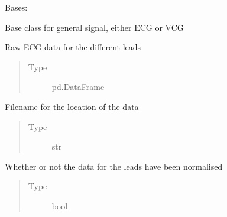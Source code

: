 \documentclass[letterpaper,10pt,english]{sphinxmanual}
\begin{document}
\begin{fulllineitems}
\label{\detokenize{_autosummary/signalanalysis.general.Signal:signalanalysis.general.Signal}}
\sphinxAtStartPar
Bases: 

\sphinxAtStartPar
Base class for general signal, either ECG or VCG

\begin{fulllineitems}
\label{\detokenize{_autosummary/signalanalysis.general.Signal:signalanalysis.general.Signal.data}}
\sphinxAtStartPar
Raw ECG data for the different leads
\begin{quote}\begin{description}
\item[{Type}] \leavevmode
\sphinxAtStartPar
pd.DataFrame

\end{description}\end{quote}

\end{fulllineitems}


\begin{fulllineitems}
\label{\detokenize{_autosummary/signalanalysis.general.Signal:signalanalysis.general.Signal.filename}}
\sphinxAtStartPar
Filename for the location of the data
\begin{quote}\begin{description}
\item[{Type}] \leavevmode
\sphinxAtStartPar
str

\end{description}\end{quote}

\end{fulllineitems}


\begin{fulllineitems}
\label{\detokenize{_autosummary/signalanalysis.general.Signal:signalanalysis.general.Signal.normalised}}
\sphinxAtStartPar
Whether or not the data for the leads have been normalised
\begin{quote}\begin{description}
\item[{Type}] \leavevmode
\sphinxAtStartPar
bool


\end{description}
\end{quote}
\end{fulllineitems}
\end{fulllineitems}
\end{document}

